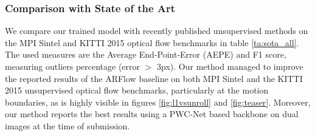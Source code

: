 \documentclass[10pt,twocolumn,letterpaper]{article}
\begin{document}
 
\subsubsection{Comparison with State of the Art}
We compare our trained model with recently published unsupervised methods on the MPI Sintel and KITTI 2015 optical flow benchmarks in table \ref{ta:sota_all}. The used measures are the Average End-Point-Error (AEPE) and F1 score, measuring outliers percentage (error $>$ 3px). 
Our method managed to improve the reported results of the ARFlow \cite{liu2020learning} baseline on both MPI Sintel and the KITTI 2015 unsupervised optical flow benchmarks, particularly at the motion boundaries, as is highly visible in figures \ref{fig:l1vsunroll} and \ref{fig:teaser}. Moreover, our method reports the best results using a PWC-Net based backbone on dual images at the time of submission.
\end{document}
